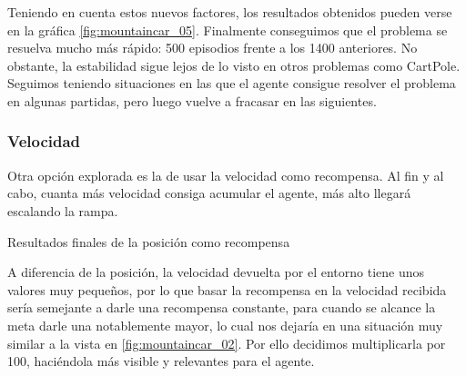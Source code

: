 Teniendo en cuenta estos nuevos factores, los resultados obtenidos pueden verse en la gráfica \ref{fig:mountaincar_05}. Finalmente conseguimos que el problema se resuelva mucho más rápido: 500 episodios frente a los 1400 anteriores. No obstante, la estabilidad sigue lejos de lo visto en otros problemas como CartPole. Seguimos teniendo situaciones en las que el agente consigue resolver el problema en algunas partidas, pero luego vuelve a fracasar en las siguientes.




\subsubsection*{Velocidad}

Otra opción explorada es la de usar la velocidad como recompensa. Al fin y al cabo, cuanta más velocidad consiga acumular el agente, más alto llegará escalando la rampa.

%
       {Resultados finales de la posición como recompensa}

A diferencia de la posición, la velocidad devuelta por el entorno tiene unos valores muy pequeños, por lo que basar la recompensa en la velocidad recibida sería semejante a darle una recompensa constante, para cuando se alcance la meta darle una notablemente mayor, lo cual nos dejaría en una situación muy similar a la vista en \ref{fig:mountaincar_02}. Por ello decidimos multiplicarla por 100, haciéndola más visible y relevantes para el agente. 

